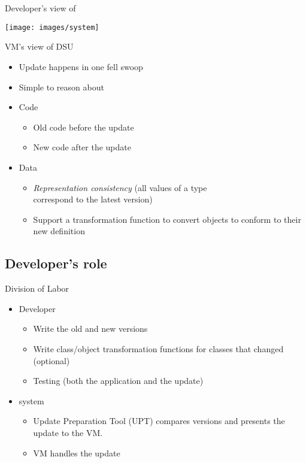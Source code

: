 
\section{\DSU}
\ShowTOC[currentsection]

\begin{frame}{Developer's view of \DSU{}}%
\begin{center}%
\texttt{[image: images/system]}%
\end{center}%
\end{frame}

\begin{frame}{VM's view of DSU}%
\begin{itemize}
\item Update happens in one fell swoop
\item Simple to reason about
\item Code
  \begin{itemize}
  \item Old code before the update
  \item New code after the update
  \end{itemize}
\item Data
  \begin{itemize}
  \item \emph{Representation consistency} (all values of a type \\
        correspond to the latest version)
  \item Support a transformation function to convert objects to conform to
        their new definition
  \end{itemize}
\end{itemize}
\end{frame}

\subsection{Developer's role}

\begin{frame}{Division of Labor}%
\begin{itemize}
\item Developer
  \begin{itemize}
  \item Write the old and new versions
  \item Write class/object transformation functions for classes that
        changed (optional)
  \item Testing (both the application and the update)
  \end{itemize}
\item \DSU{} system
  \begin{itemize}
  \item Update Preparation Tool (UPT) compares versions and presents the
        update to the \DSU{} VM.
  \item \DSU{} VM handles the update
  \end{itemize}
\end{itemize}
\end{frame}

